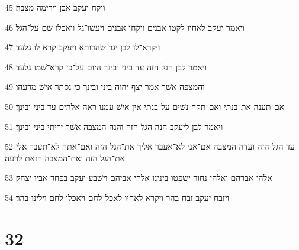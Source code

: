 \par 45 ויקח יעקב אבן וירימה מצבה׃
\par 46 ויאמר יעקב לאחיו לקטו אבנים ויקחו אבנים ויעשׂו־גל ויאכלו שׁם על־הגל׃
\par 47 ויקרא־לו לבן יגר שׂהדותא ויעקב קרא לו גלעד׃
\par 48 ויאמר לבן הגל הזה עד ביני ובינך היום על־כן קרא־שׁמו גלעד׃
\par 49 והמצפה אשׁר אמר יצף יהוה ביני ובינך כי נסתר אישׁ מרעהו׃
\par 50 אם־תענה את־בנתי ואם־תקח נשׁים על־בנתי אין אישׁ עמנו ראה אלהים עד ביני ובינך׃
\par 51 ויאמר לבן ליעקב הנה הגל הזה והנה המצבה אשׁר יריתי ביני ובינך׃
\par 52 עד הגל הזה ועדה המצבה אם־אני לא־אעבר אליך את־הגל הזה ואם־אתה לא־תעבר אלי את־הגל הזה ואת־המצבה הזאת לרעה׃
\par 53 אלהי אברהם ואלהי נחור ישׁפטו בינינו אלהי אביהם וישׁבע יעקב בפחד אביו יצחק׃
\par 54 ויזבח יעקב זבח בהר ויקרא לאחיו לאכל־לחם ויאכלו לחם וילינו בהר׃

\chapter{32}

